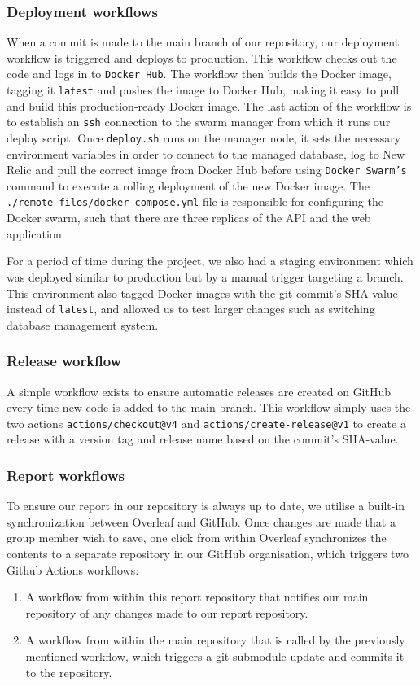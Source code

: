 \documentclass{article}
\begin{document}
\subsubsection{Deployment workflows}
When a commit is made to the main branch of our repository, our deployment workflow is triggered and deploys to production. 
This workflow checks out the code and logs in to \texttt{Docker Hub}. The workflow then builds the Docker image, tagging it \texttt{latest} and pushes the image to Docker Hub, making it easy to pull and build this production-ready Docker image. The last action of the workflow is to establish an \texttt{ssh} connection to the swarm manager from which it runs our deploy script.
Once \texttt{deploy.sh} runs on the manager node, it sets the necessary environment variables in order to connect to the managed database, log to New Relic and pull the correct image from Docker Hub before using \texttt{Docker Swarm's} command to execute a rolling deployment of the new Docker image. The \texttt{./remote\_files/docker-compose.yml} file is responsible for configuring the Docker swarm, such that there are three replicas of the API and the web application.

For a period of time during the project, we also had a staging environment which was deployed similar to production but by a manual trigger targeting a branch. This environment also tagged Docker images with the git commit's SHA-value instead of \texttt{latest}, and allowed us to test larger changes such as switching database management system.

\subsubsection{Release workflow}
A simple workflow exists to ensure automatic releases are created on GitHub every time new code is added to the main branch. This workflow simply uses the two actions \texttt{actions/checkout@v4} and \texttt{actions/create-release@v1} to create a release with a version tag and release name based on the commit's SHA-value.

\subsubsection{Report workflows}
To ensure our report in our repository is always up to date, we utilise a built-in synchronization between Overleaf and GitHub. Once changes are made that a group member wish to save, one click from within Overleaf synchronizes the contents to a separate repository in our GitHub organisation, which triggers two Github Actions workflows:
\begin{enumerate}
    \item A workflow from within this report repository that notifies our main repository of any changes made to our report repository.
    \item A workflow from within the main repository that is called by the previously mentioned workflow, which triggers a git submodule update and commits it to the repository.
\end{enumerate}
\end{document}
